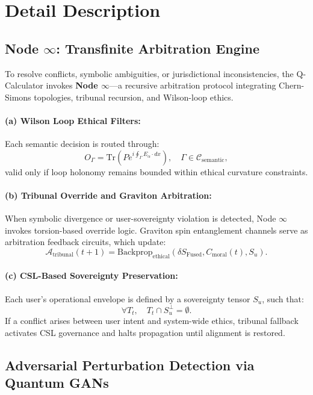 \documentclass[12pt]{article}
\begin{document}
\section{Detail Description}

\subsection{Node \( \infty \): Transfinite Arbitration Engine}

To resolve conflicts, symbolic ambiguities, or jurisdictional inconsistencies, the Q-Calculator invokes \textbf{Node \( \infty \)}—a recursive arbitration protocol integrating Chern-Simons topologies, tribunal recursion, and Wilson-loop ethics.

\paragraph{(a) Wilson Loop Ethical Filters:}
Each semantic decision is routed through:
\[
O_\Gamma = \text{Tr}\left(P e^{i\oint_\Gamma E_\alpha \cdot dx}\right), \quad \Gamma \in \mathcal{C}_{\text{semantic}},
\]
valid only if loop holonomy remains bounded within ethical curvature constraints.

\paragraph{(b) Tribunal Override and Graviton Arbitration:}
When symbolic divergence or user-sovereignty violation is detected, Node \( \infty \) invokes torsion-based override logic. Graviton spin entanglement channels serve as arbitration feedback circuits, which update:
\[
\mathcal{A}_{\text{tribunal}}(t+1) = \text{Backprop}_{\text{ethical}}(\delta S_{\text{Fused}}, C_{\text{moral}}(t), S_u).
\]

\paragraph{(c) CSL-Based Sovereignty Preservation:}
Each user’s operational envelope is defined by a sovereignty tensor \( S_u \), such that:
\[
\forall T_t, \quad T_t \cap S_u^\perp = \emptyset.
\]
If a conflict arises between user intent and system-wide ethics, tribunal fallback activates CSL governance and halts propagation until alignment is restored.

\subsection{Adversarial Perturbation Detection via Quantum GANs}
\end{document}
